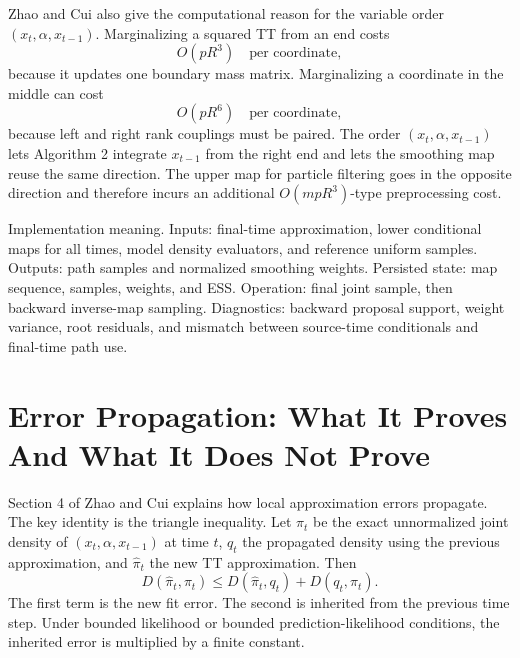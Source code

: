 \documentclass[11pt]{article}
\numberwithin{equation}{section}
\begin{document}
Zhao and Cui \cite{zhao2024ttsequential} also give the computational reason for the variable order
\((x_t,\alpha,x_{t-1})\).  Marginalizing a squared TT from an end costs
\begin{equation}
    O(pR^3)\quad\text{per coordinate},
    \label{eq:p24-b8}
\end{equation}
because it updates one boundary mass matrix.  Marginalizing a coordinate in the
middle can cost
\begin{equation}
    O(pR^6)\quad\text{per coordinate},
    \label{eq:p24-b9}
\end{equation}
because left and right rank couplings must be paired.  The order
\((x_t,\alpha,x_{t-1})\) lets Algorithm 2 integrate \(x_{t-1}\) from the right
end and lets the smoothing map reuse the same direction.  The upper map for
particle filtering goes in the opposite direction and therefore incurs an
additional \(O(mpR^3)\)-type preprocessing cost.

Implementation meaning. Inputs: final-time approximation, lower
conditional maps for all times, model density evaluators, and reference uniform
samples.  Outputs: path samples and normalized smoothing weights.  Persisted
state: map sequence, samples, weights, and ESS.  Operation: final joint sample,
then backward inverse-map sampling.  Diagnostics: backward proposal support,
weight variance, root residuals, and mismatch between source-time conditionals
and final-time path use.

\section{Error Propagation: What It Proves And What It Does Not Prove}

Section 4 of Zhao and Cui \cite{zhao2024ttsequential} explains how local approximation errors propagate.  The
key identity is the triangle inequality.  Let \(\pi_t\) be the exact
unnormalized joint density of \((x_t,\alpha,x_{t-1})\) at time \(t\), \(q_t\)
the propagated density using the previous approximation, and
\(\widehat\pi_t\) the new TT approximation.  Then
\begin{equation}
    D(\widehat\pi_t,\pi_t)
    \le
    D(\widehat\pi_t,q_t)+D(q_t,\pi_t).
    \label{eq:p24-e1}
\end{equation}
The first term is the new fit error.  The second is inherited from the previous
time step.  Under bounded likelihood or bounded prediction-likelihood
conditions, the inherited error is multiplied by a finite constant.
\end{document}
